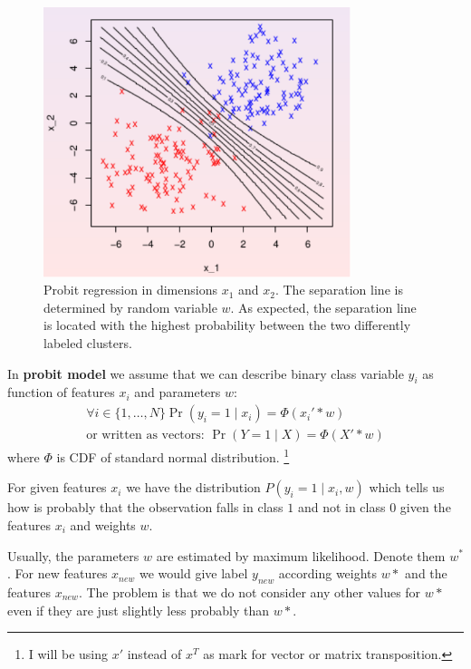 \begin{figure}[!hb]
\centering
\includegraphics[width=0.8\textwidth]{probit2D}
\caption{Probit regression in dimensions $x_1$ and $x_2$. The separation line is determined by random variable $w$. As expected, the separation line is located with the highest probability between the two differently labeled clusters.}
\label{fig:probit2D}
\end{figure}

\begin{defn}
    In {\bf probit model} we assume that we can describe binary class variable $y_i$ as function of features $x_i$ and parameters $w$:
\begin{align}
    \forall i\in\{1,\ldots,N\} \Pr(y_i=1 \mid x_i) = \Phi(x_i' * w) \\
    \text{or written as vectors: } \Pr(Y=1 \mid X) = \Phi(X' * w)
\end{align}
where $\Phi$ is CDF of standard normal distribution.
\footnote{I will be using $x'$ instead of $x^T$ as mark for vector or matrix transposition.}
\end{defn}

For given features $x_i$ we have the distribution $P(y_i=1 \mid x_i, w)$ which tells us how is probably that the observation falls in class $1$ and not in class $0$ given the features $x_i$ and weights $w$.

Usually, the parameters $w$ are estimated by maximum likelihood. Denote them $w^*$. For new features $x_{new}$ we would give label $y_{new}$ according weights $w*$ and the features $x_{new}$. The problem is that we do not consider any other values for $w*$ even if they are just slightly less probably than $w*$. 

